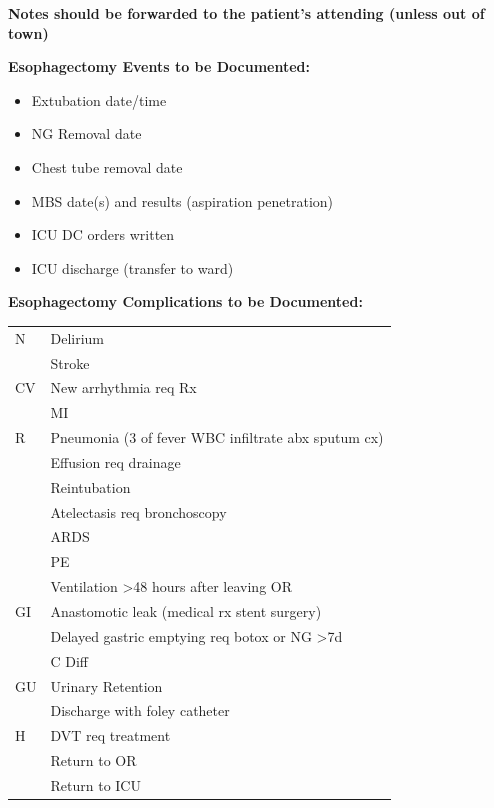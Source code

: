 \documentclass[
  letterpaper,
]{scrbook}
\providecommand{\tightlist}{%
  \setlength{\itemsep}{0pt}\setlength{\parskip}{0pt}}
\begin{document}
\textbf{Notes should be forwarded to the patient's attending (unless out
of town)}

\textbf{Esophagectomy Events to be Documented:}

\begin{itemize}
\tightlist
\item
  Extubation date/time
\item
  NG Removal date
\item
  Chest tube removal date
\item
  MBS date(s) and results (aspiration \textbar{} penetration)
\item
  ICU DC orders written
\item
  ICU discharge (transfer to ward)
\end{itemize}

\textbf{Esophagectomy Complications to be Documented:}

\begin{longtable}[]{@{}
  >{\raggedright\arraybackslash}p{}
  >{\raggedright\arraybackslash}p{}@{}}
\toprule\noalign{}
\endhead
\bottomrule\noalign{}
\endlastfoot
N & Delirium \\
& Stroke \\
CV & New arrhythmia req Rx \\
& MI \\
R & Pneumonia (3 of fever \textbar{} WBC \textbar{} infiltrate
\textbar{} abx \textbar{} sputum cx) \\
& Effusion req drainage \\
& Reintubation \\
& Atelectasis req bronchoscopy \\
& ARDS \\
& PE \\
& Ventilation \textgreater48 hours after leaving OR \\
GI & Anastomotic leak (medical rx \textbar{} stent \textbar{}
surgery) \\
& Delayed gastric emptying req botox or NG \textgreater7d \\
& C Diff \\
GU & Urinary Retention \\
& Discharge with foley catheter \\
H & DVT req treatment \\
& Return to OR \\
& Return to ICU \\
\end{longtable}
\end{document}
